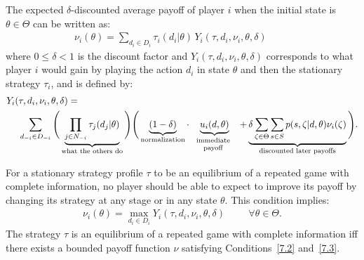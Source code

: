 The expected $\delta$-discounted average payoff of player $i$ when the initial state is $\theta \in \Theta$ can be written as:
\begin{align}
	\nu_i(\theta) = \sum_{d_i \in D_i} \tau_i(d_i|\theta) \, Y_i(\tau , d_i , \nu_i , \theta , \delta) \hspace{1cm}
	\label{7.2}
\end{align}
where $0 \leq \delta < 1$ is the discount factor and $Y_i(\tau , d_i , \nu_i , \theta , \delta)$ corresponds to what player $i$ would gain by playing the action $d_i$ in state $\theta$ and then the stationary strategy $\tau_i$, and is defined by:
\begin{align*}
	Y_i(&\tau , d_i , \nu_i , \theta , \delta) = \\ &\sum_{d_{-i} \in D_{-i}} \Bigg( \underbrace{\prod_{j \in N_{-i}} \tau_j(d_j|\theta)}_{\text{what the others do}} \Bigg)\Bigg( \underbrace{(1-\delta)}_{\text{normalization}} \cdot \underbrace{u_i(d,\theta)}_{\begin{minipage}{1.8cm}\scriptsize\text{\begin{tabular}{c} immediate \\ payoff \end{tabular}}\end{minipage}}+ \underbrace{\delta \sum_{\zeta \in \Theta} \sum_{s \in S}p(s, \zeta|d,\theta)\nu_i(\zeta)}_{\text{discounted later payoffs}} \Bigg).
\end{align*}

For a stationary strategy profile $\tau$ to be an equilibrium of a repeated game with complete information, no player should be able to expect to improve its payoff by changing its strategy at any stage or in any state $\theta$. This condition implies:
\begin{align}
	\nu_i(\theta)= \max_{d_i \in D_i} Y_i(\tau , d_i , \nu_i , \theta , \delta) \hspace{1cm} \forall \theta \in \Theta.
	\label{7.3}
\end{align}
The strategy $\tau$ is an equilibrium of a repeated game with complete information iff there exists a bounded payoff function $\nu$ satisfying Conditions~\eqref{7.2} and~\eqref{7.3}.



\ifx \globalmark \undefined %


	
\else 
	
\fi